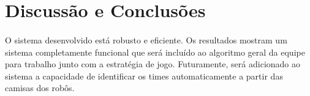 \documentclass[conference, harvard, brazil, english]{sbatex}
\begin{document}
		
	\section{Discussão e Conclusões}
	\paragraph{}
	O sistema desenvolvido está robusto e eficiente. Os resultados mostram um sistema completamente funcional que será incluído ao algoritmo geral da equipe para trabalho junto com a estratégia de jogo. Futuramente, será adicionado ao sistema a capacidade de identificar os times automaticamente a partir das camisas dos robôs.
\end{document}
